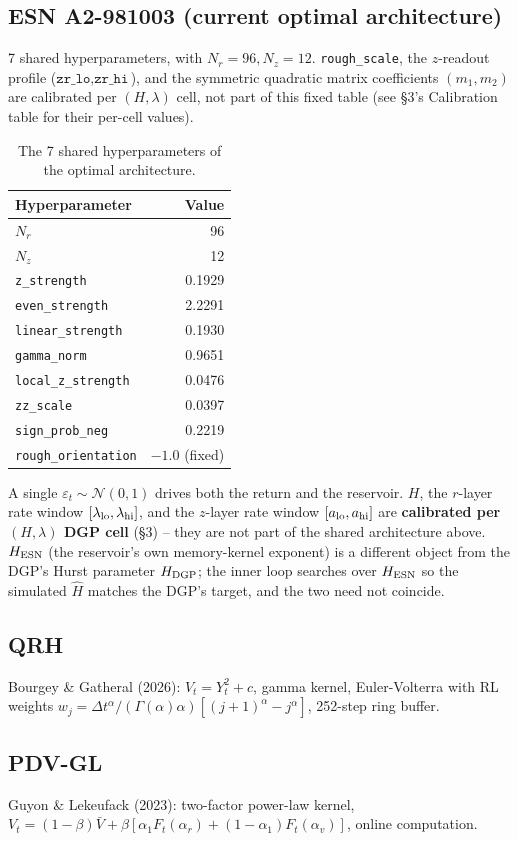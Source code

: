 \documentclass[11pt,a4paper]{article}
\begin{document}
\subsection{ESN A2-981003 (current optimal architecture)}
7 shared hyperparameters, with $N_r=96,N_z=12$.
\texttt{rough\_scale}, the $z$-readout profile ($\texttt{zr\_lo},
\texttt{zr\_hi}$), and the symmetric quadratic matrix coefficients
$(m_1,m_2)$ are calibrated per $(H,\lambda)$ cell, not part of this
fixed table (see \S3's Calibration table for their per-cell values).
\begin{table}[H]
\centering
\caption{The 7 shared hyperparameters of the optimal architecture.}
\begin{tabular}{@{}lr@{}}
\toprule
Hyperparameter & Value \\
\midrule
$N_r$ & 96 \\
$N_z$ & 12 \\
\texttt{z\_strength} & 0.1929 \\
\texttt{even\_strength} & 2.2291 \\
\texttt{linear\_strength} & 0.1930 \\
\texttt{gamma\_norm} & 0.9651 \\
\texttt{local\_z\_strength} & 0.0476 \\
\texttt{zz\_scale} & 0.0397 \\
\texttt{sign\_prob\_neg} & 0.2219 \\
\texttt{rough\_orientation} & $-1.0$ (fixed) \\
\bottomrule
\end{tabular}
\end{table}
A single $\varepsilon_t\sim\mathcal{N}(0,1)$ drives both the return and
the reservoir. $H$, the $r$-layer rate window
$[\lambda_{\rm lo},\lambda_{\rm hi}]$, and the $z$-layer rate window
$[a_{\rm lo},a_{\rm hi}]$ are \textbf{calibrated per $(H,\lambda)$ DGP
cell} (\S3) -- they are not part of the shared architecture above.
$H_{\rm ESN}$ (the reservoir's own memory-kernel exponent) is a
different object from the DGP's Hurst parameter $H_{\rm DGP}$; the
inner loop searches over $H_{\rm ESN}$ so the simulated $\hat H$
matches the DGP's target, and the two need not coincide.
\subsection{QRH}
Bourgey \& Gatheral (2026): $V_t=Y_t^2+c$, gamma kernel, Euler-Volterra
with RL weights $w_j=\Delta t^\alpha/(\Gamma(\alpha)\alpha)[(j+1)^\alpha-j^\alpha]$,
252-step ring buffer.
\subsection{PDV-GL}
Guyon \& Lekeufack (2023): two-factor power-law kernel,
$V_t=(1-\beta)\bar V+\beta[\alpha_1 F_t(\alpha_r)+(1-\alpha_1)F_t(\alpha_v)]$,
online computation.
\end{document}
